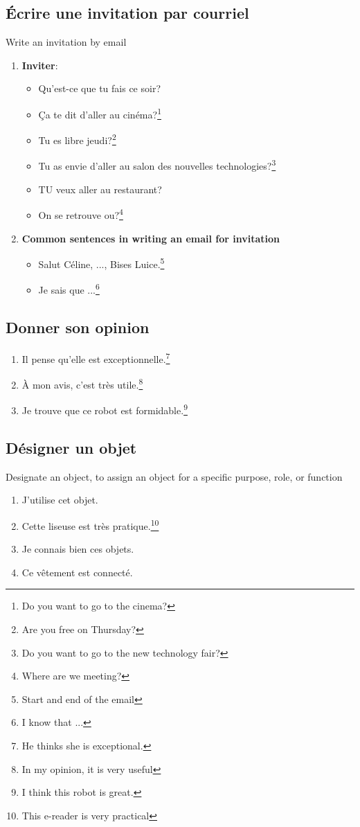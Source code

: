 \documentclass[math,code]{amznotes}
\theoremstyle{remark}
\begin{document}
\subsection*{Écrire une invitation par courriel}
{\small Write an invitation by email}
\begin{enumerate}
    \item \textbf{Inviter}:
    \begin{itemize}
        \item Qu'est-ce que tu fais ce soir?
        \item Ça te dit d'aller au cinéma?\footnote{Do you want to go to the cinema?}
        \item Tu es libre jeudi?\footnote{Are you free on Thursday?}
        \item Tu as envie d'aller au salon des nouvelles technologies?\footnote{Do you want to go to the new technology fair?}
        \item TU veux aller au restaurant?
        \item On se retrouve ou?\footnote{Where are we meeting?}
    \end{itemize}
    \item \textbf{Common sentences in writing an email for invitation}
    \begin{itemize}
        \item Salut Céline, ..., Bises Luice.\footnote{Start and end of the email}
        \item Je sais que ...\footnote{I know that ...}
    \end{itemize}
\end{enumerate}

\subsection*{Donner son opinion}
\begin{enumerate}
    \item Il pense qu'elle est exceptionnelle.\footnote{He thinks she is exceptional.}
    \item À mon avis, c'est très utile.\footnote{In my opinion, it is very useful}
    \item Je trouve que ce robot est formidable.\footnote{I think this robot is great.}
\end{enumerate}

\subsection*{Désigner un objet}
{\small Designate an object, to assign an object for a specific purpose, role, or function}
\begin{enumerate}
    \item J'utilise cet objet.
    \item Cette liseuse est très pratique.\footnote{This e-reader is very practical}
    \item Je connais bien ces objets.
    \item Ce vêtement est connecté.
\end{enumerate}
\end{document}
